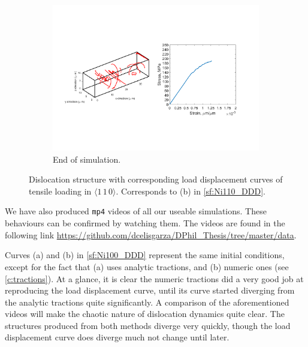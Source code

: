 \begin{figure}
    \begin{subfigure}[t]{\linewidth}
        \centering
        \includegraphics[trim={1.75cm 5cm 2.5cm 5.5cm},clip,width=\linewidth]{../data/16-Mar-2021_4_tensile_ni_110_225000.pdf}
        \caption{End of simulation.}
    \end{subfigure}
    \caption[Dislocation structure with corresponding load displacement curves of tensile loading in $\langle 1\, 1\, 0 \rangle$.]{Dislocation structure with corresponding load displacement curves of tensile loading in $\langle 1\, 1\, 0 \rangle$. Corresponds to (b) in \cref{sf:Ni110_DDD}.}
    \label{f:Ni110_bumps}
\end{figure}

We have also produced \texttt{mp4} videos of all our useable simulations. These behaviours can be confirmed by watching them. The videos are found in the following link \href{https://github.com/dcelisgarza/DPhil_Thesis/tree/master/data}{https://github.com/dcelisgarza/DPhil\_Thesis/tree/master/data}.

Curves (a) and (b) in \cref{sf:Ni100_DDD} represent the same initial conditions, except for the fact that (a) uses analytic tractions, and (b) numeric ones (see \cref{c:tractions}). At a glance, it is clear the numeric tractions did a very good job at reproducing the load displacement curve, until its curve started diverging from the analytic tractions quite significantly. A comparison of the aforementioned videos will make the chaotic nature of dislocation dynamics quite clear. The structures produced from both methods diverge very quickly, though the load displacement curve does diverge much not change until later.

